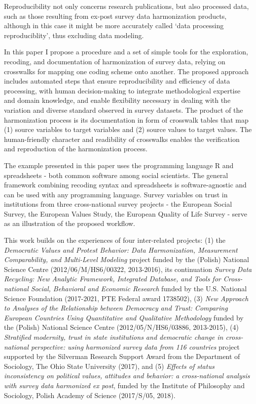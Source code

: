 \documentclass[12pt,]{article}
\begin{document}
Reproducibility not only concerns research publications, but also processed data, such as those resulting from ex-post survey data harmonization products, although in this case it might be more accurately called `data processing reproduciblity', thus excluding data modeling.

In this paper I propose a procedure and a set of simple tools for the exploration, recoding, and documentation of harmonization of survey data, relying on crosswalks for mapping one coding scheme onto another. The proposed approach includes automated steps that ensure reproducibility and efficiency of data processing, with human decision-making to integrate methodological expertise and domain knowledge, and enable flexibility necessary in dealing with the variation and diverse standard observed in survey datasets.
The product of the harmonization process is its documentation in form of crosswalk tables that map (1) source variables to target variables and (2) source values to target values. The human-friendly character and readibility of crosswalks enables the verification and reproduction of the harmonization process.

The example presented in this paper uses the programming language R and spreadsheets - both common software among social scientists. The general framework combining recoding syntax and spreadsheets is software-agnostic and can be used with any programming language. Survey variables on trust in institutions from three cross-national survey projects - the European Social Survey, the European Values Study, the European Quality of Life Survey - serve as an illustration of the proposed workflow.

This work builds on the experiences of four inter-related projects: (1) the \emph{Democratic Values and Protest Behavior: Data Harmonization, Measurement Comparability, and Multi-Level Modeling} project funded by the (Polish) National Science Centre (2012/06/M/HS6/00322, 2013-2016), its continuation \emph{Survey Data Recycling: New Analytic Framework, Integrated Database, and Tools for Cross-national Social, Behavioral and Economic Research} funded by the U.S. National Science Foundation (2017-2021, PTE Federal award 1738502), (3) \emph{New Approach to Analyses of the Relationship between Democracy and Trust: Comparing European Countries Using Quantitative and Qualitative Methodology} funded by the (Polish) National Science Centre (2012/05/N/HS6/03886, 2013-2015), (4) \emph{Stratified modernity, trust in state institutions and democratic change in cross-national perspective: using harmonized survey data from 116 countries} project supported by the Silverman Research Support Award from the Department of Sociology, The Ohio State University (2017), and (5) \emph{Effects of status inconsistency on political values, attitudes and behavior: a cross-national analysis with survey data harmonized ex post}, funded by the Institute of Philosophy and Sociology, Polish Academy of Science (2017/S/05, 2018).
\end{document}
